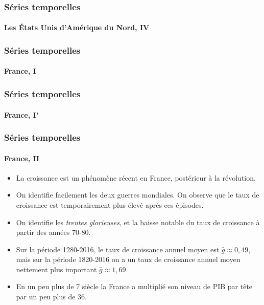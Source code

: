 \documentclass[10pt,notheorems]{beamer}
\theoremstyle{plain}
\theoremstyle{definition} %
\begin{document}
\begin{frame}
  \frametitle{Séries temporelles}
  \framesubtitle{Les États Unis d'Amérique du Nord, IV}

  \begin{center}
    
  \end{center}

\end{frame}



\begin{frame}
  \frametitle{Séries temporelles}
  \framesubtitle{France, I}

  \begin{center}
    
  \end{center}

\end{frame}

\begin{frame}
  \frametitle{Séries temporelles}
  \framesubtitle{France, I'}

  \begin{center}
    
  \end{center}

\end{frame}


\begin{frame}
  \frametitle{Séries temporelles}
  \framesubtitle{France, II}

  \begin{itemize}

  \item La croissance est un phénomène récent en France, postérieur à la révolution.\newline

  \item On identifie facilement les deux guerres mondiales. On observe que le taux de croissance est temporairement plus élevé après ces épisodes.\newline

  \item On identifie les \textit{trentes glorieuses}, et la baisse notable du taux de croissance à partir des années 70-80.\newline

  \item Sur la période 1280-2016, le taux de croissance annuel moyen est $\bar g \approx 0,49$, mais sur la période 1820-2016 on a un taux de croissance annuel moyen nettement plus important $\bar g \approx 1,69$.\newline

  \item En un peu plus de 7 siècle la France a multiplié son niveau de PIB par tête par un peu plus de 36.

  \end{itemize}

\end{frame}
\end{document}
